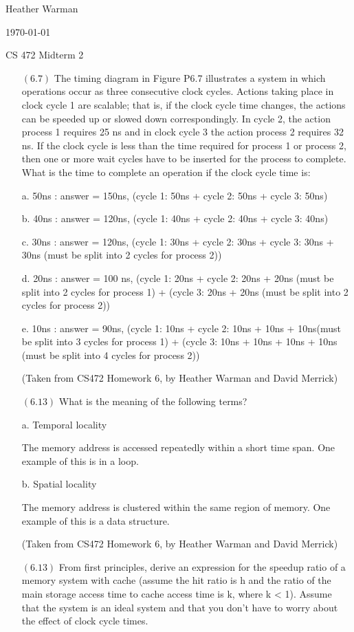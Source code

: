 \documentclass[letterpaper,10pt,titlepage]{article}
\def\name{Heather Warman}
\begin{document}
\hfill \name

\hfill \today

\hfill CS 472 Midterm 2

\begin{enumerate}
\item[$(6.7)$] The timing diagram in Figure P6.7 illustrates a system in which operations occur as three consecutive clock cycles. Actions taking place in clock cycle 1 are scalable; that is, if the clock cycle time changes, the actions can be speeded up or slowed down correspondingly. In cycle 2, the action process 1 requires 25 ns and in clock cycle 3 the action process 2 requires 32 ns. If the clock cycle is less than the time required for process 1 or process 2, then one or more wait cycles have to be inserted for the process to complete. What is the time to complete an operation if the clock cycle time is:

	a. 50ns : answer = 150ns, (cycle 1: 50ns + cycle 2: 50ns + cycle 3: 50ns)

	b. 40ns : answer = 120ns, (cycle 1: 40ns + cycle 2: 40ns + cycle 3: 40ns)

	c. 30ns : answer = 120ns, (cycle 1: 30ns + cycle 2: 30ns + cycle 3: 30ns + 30ns (must be split into 2 cycles for process 2))

	d. 20ns : answer = 100 ns, (cycle 1: 20ns + cycle 2: 20ns + 20ns (must be split into 2 cycles for process 1) + (cycle 3: 20ns + 20ns (must be split into 2 cycles for process 2))

	e. 10ns : answer = 90ns, (cycle 1: 10ns + cycle 2: 10ns + 10ns + 10ns(must be split into 3 cycles for process 1) + (cycle 3: 10ns + 10ns + 10ns + 10ns (must be split into 4 cycles for process 2))

(Taken from CS472 Homework 6, by Heather Warman and David Merrick)


\item[$(6.13)$] What is the meaning of the following terms?

a. Temporal locality 

The memory address is accessed repeatedly within a short time span. One example of this is in a loop.

b. Spatial locality 

The memory address is clustered within the same region of memory. One example of this is a data structure. 

(Taken from CS472 Homework 6, by Heather Warman and David Merrick)


\item[$(6.13)$] From first principles, derive an expression for the speedup ratio of a memory system with cache (assume the hit ratio is h and the ratio of the main storage access time to cache access time is k, where k < 1). Assume that the system is an ideal system and that you don’t have to worry about the effect of clock cycle times. 


\end{enumerate}
\end{document}
